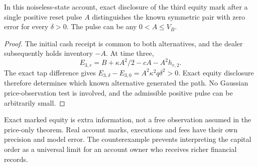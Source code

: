 \begin{proposition}
\label{prop:equity_disclosure}
In this noiseless-state account, exact disclosure of the third equity mark after a single positive reset pulse $A$ distinguishes the known symmetric pair with zero error for every $\delta>0$. The pulse can be any $0<A\le V_B$.
\end{proposition}
\begin{proof}
The initial cash receipt is common to both alternatives, and the dealer subsequently holds inventory $-A$. At time three,
\[E_{3,r}=B+\kappa A^2/2-cA-A^2h_{r,2}.\]
The exact tap difference gives $E_{3,\delta}-E_{3,0}=A^2\kappa^2q\delta^2>0$. Exact equity disclosure therefore determines which known alternative generated the path. No Gaussian price-observation test is involved, and the admissible positive pulse can be arbitrarily small.
\end{proof}
Exact marked equity is extra information, not a free observation assumed in the price-only theorem. Real account marks, executions and fees have their own precision and model error. The counterexample prevents interpreting the capital order as a universal limit for an account owner who receives richer financial records.

